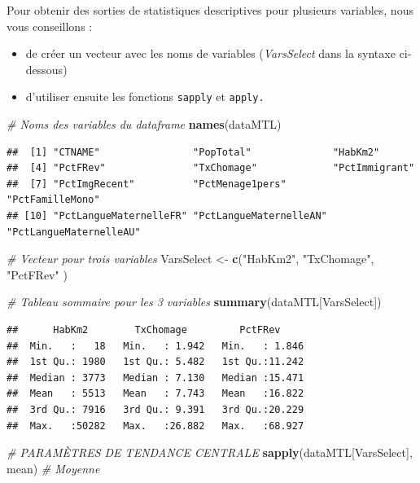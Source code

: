 \documentclass[
  11pt,
  french,
]{book}
\makeatletter
\newenvironment{Shaded}{\begin{snugshade}}{\end{snugshade}}
\newcommand{\CommentTok}[1]{\textcolor[rgb]{0.56,0.35,0.01}{\textit{#1}}}
\newcommand{\KeywordTok}[1]{\textcolor[rgb]{0.13,0.29,0.53}{\textbf{#1}}}
\newcommand{\NormalTok}[1]{#1}
\newcommand{\StringTok}[1]{\textcolor[rgb]{0.31,0.60,0.02}{#1}}
\providecommand{\tightlist}{%
  \setlength{\itemsep}{0pt}\setlength{\parskip}{0pt}}
\newenvironment{kframe}{%
\medskip{}
\setlength{\fboxsep}{.8em}
 \def\at@end@of@kframe{}%
 \ifinner\ifhmode%
  \def\at@end@of@kframe{\end{minipage}}%
  \begin{minipage}{\columnwidth}%
 \fi\fi%
 \def\FrameCommand##1{\hskip\@totalleftmargin \hskip-\fboxsep
 \colorbox{shadecolor}{##1}\hskip-\fboxsep
     \hskip-\linewidth \hskip-\@totalleftmargin \hskip\columnwidth}%
 \MakeFramed {\advance\hsize-\width
   \@totalleftmargin\z@ \linewidth\hsize
   \@setminipage}}%
 {\par\unskip\endMakeFramed%
 \at@end@of@kframe}
\renewenvironment{Shaded}{\begin{kframe}}{\end{kframe}}
\makeatother
\begin{document}
Pour obtenir des sorties de statistiques descriptives pour plusieurs variables, nous vous conseillons :

\begin{itemize}
\tightlist
\item
  de créer un vecteur avec les noms de variables (\emph{VarsSelect} dans la syntaxe ci-dessous)
\item
  d'utiliser ensuite les fonctions \texttt{sapply} et \texttt{apply.}
\end{itemize}

\begin{Shaded}
\begin{Highlighting}[]
\CommentTok{# Noms des variables du dataframe}
\KeywordTok{names}\NormalTok{(dataMTL)}
\end{Highlighting}
\end{Shaded}

\begin{verbatim}
##  [1] "CTNAME"                "PopTotal"              "HabKm2"               
##  [4] "PctFRev"               "TxChomage"             "PctImmigrant"         
##  [7] "PctImgRecent"          "PctMenage1pers"        "PctFamilleMono"       
## [10] "PctLangueMaternelleFR" "PctLangueMaternelleAN" "PctLangueMaternelleAU"
\end{verbatim}

\begin{Shaded}
\begin{Highlighting}[]
\CommentTok{# Vecteur pour trois variables}
\NormalTok{VarsSelect <-}\StringTok{ }\KeywordTok{c}\NormalTok{(}\StringTok{"HabKm2"}\NormalTok{, }\StringTok{"TxChomage"}\NormalTok{, }\StringTok{"PctFRev"}\NormalTok{ )}

\CommentTok{# Tableau sommaire pour les 3 variables}
\KeywordTok{summary}\NormalTok{(dataMTL[VarsSelect])}
\end{Highlighting}
\end{Shaded}

\begin{verbatim}
##      HabKm2        TxChomage         PctFRev      
##  Min.   :   18   Min.   : 1.942   Min.   : 1.846  
##  1st Qu.: 1980   1st Qu.: 5.482   1st Qu.:11.242  
##  Median : 3773   Median : 7.130   Median :15.471  
##  Mean   : 5513   Mean   : 7.743   Mean   :16.822  
##  3rd Qu.: 7916   3rd Qu.: 9.391   3rd Qu.:20.229  
##  Max.   :50282   Max.   :26.882   Max.   :68.927
\end{verbatim}

\begin{Shaded}
\begin{Highlighting}[]
\CommentTok{# PARAMÈTRES DE TENDANCE CENTRALE}
\KeywordTok{sapply}\NormalTok{(dataMTL[VarsSelect], mean)   }\CommentTok{# Moyenne}
\end{Highlighting}
\end{Shaded}
\end{document}
